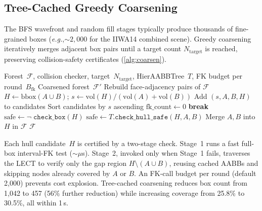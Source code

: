 \documentclass[letterpaper, conference]{IEEEtran}
\newcommand{\calF}{\mathcal{F}}
\newcommand{\eg}{\textit{e.g.},\xspace}
\begin{document}
\subsection{Tree-Cached Greedy Coarsening}\label{sec:coarsen}

The BFS wavefront and random fill stages typically produce thousands of
fine-grained boxes (\eg ${\sim}2{,}000$ for the IIWA14 combined scene).
Greedy coarsening iteratively merges adjacent box pairs until a
target count $N_\text{target}$ is reached, preserving collision-safety
certificates (\cref{alg:coarsen}).

\begin{algorithm}[t]
\caption{Tree-Cached Greedy Coarsening}\label{alg:coarsen}
\footnotesize
\begin{algorithmic}[1]
\REQUIRE Forest~$\calF$, collision checker, target~$N_\text{target}$,
  HierAABBTree~$T$, FK budget per round~$B_\text{fk}$
\ENSURE Coarsened forest~$\calF'$
\REPEAT
  \STATE Rebuild face-adjacency pairs of $\calF$
    \STATE $H \leftarrow \text{bbox}(A \cup B)$;\;
           $s \leftarrow \mathrm{vol}(H)/(\mathrm{vol}(A)+\mathrm{vol}(B))$
      \STATE Add $(s, A, B, H)$ to candidates
    \ENDIF
  \ENDFOR
  \STATE Sort candidates by $s$ ascending
  \STATE $\text{fk\_count} \leftarrow 0$
    \IF{$|\calF| \leq N_\text{target}$}
      \STATE \textbf{break}
    \ENDIF
    \STATE $\text{safe} \leftarrow \neg\;\texttt{check\_box}(H)$
      \STATE $\text{safe} \leftarrow T.\texttt{check\_hull\_safe}(H, A, B)$
    \ENDIF
      \STATE Merge $A, B$ into $H$ in $\calF$
    \ENDIF
  \ENDFOR
{}
\RETURN $\calF$
\end{algorithmic}
\end{algorithm}

Each hull candidate~$H$ is certified by a two-stage check.
Stage~1 runs a fast full-box interval-FK test (${\sim}\mu$s).
Stage~2, invoked only when Stage~1 fails, traverses the LECT to
verify only the gap region $H \setminus (A \cup B)$, reusing cached
AABBs and skipping nodes already covered by $A$ or $B$.
An FK-call budget per round (default 2{,}000) prevents cost explosion.
Tree-cached coarsening reduces box count from 1{,}042 to 457
(56\% further reduction) while increasing coverage from 25.8\% to
30.5\%, all within 1\,s.
\end{document}
